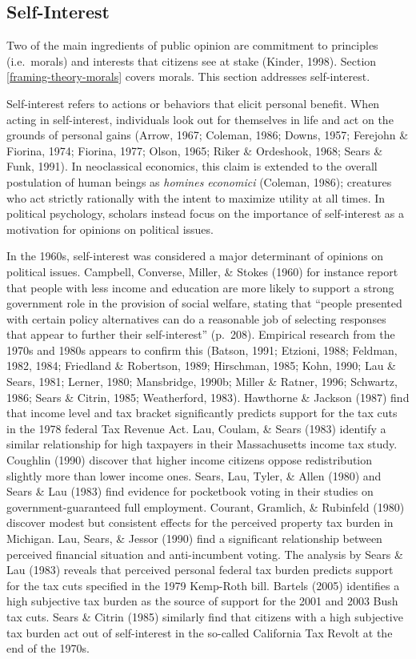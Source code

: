 \documentclass[12pt,econ]{sources/authesis}
\begin{document}
\hypertarget{framing-theory-self_interest}{%
\subsection{Self-Interest}\label{framing-theory-self_interest}}

Two of the main ingredients of public opinion are commitment to principles (i.e.~morals) and interests that citizens see at stake (Kinder, 1998). Section \ref{framing-theory-morals} covers morals. This section addresses self-interest.

Self-interest refers to actions or behaviors that elicit personal benefit. When acting in self-interest, individuals look out for themselves in life and act on the grounds of personal gains (Arrow, 1967; Coleman, 1986; Downs, 1957; Ferejohn \& Fiorina, 1974; Fiorina, 1977; Olson, 1965; Riker \& Ordeshook, 1968; Sears \& Funk, 1991). In neoclassical economics, this claim is extended to the overall postulation of human beings as \textit{homines economici} (Coleman, 1986); creatures who act strictly rationally with the intent to maximize utility at all times. In political psychology, scholars instead focus on the importance of self-interest as a motivation for opinions on political issues.

In the 1960s, self-interest was considered a major determinant of opinions on political issues. Campbell, Converse, Miller, \& Stokes (1960) for instance report that people with less income and education are more likely to support a strong government role in the provision of social welfare, stating that ``people presented with certain policy alternatives can do a reasonable job of selecting responses that appear to further their self-interest'' (p.~208). Empirical research from the 1970s and 1980s appears to confirm this (Batson, 1991; Etzioni, 1988; Feldman, 1982, 1984; Friedland \& Robertson, 1989; Hirschman, 1985; Kohn, 1990; Lau \& Sears, 1981; Lerner, 1980; Mansbridge, 1990b; Miller \& Ratner, 1996; Schwartz, 1986; Sears \& Citrin, 1985; Weatherford, 1983). Hawthorne \& Jackson (1987) find that income level and tax bracket significantly predicts support for the tax cuts in the 1978 federal Tax Revenue Act. Lau, Coulam, \& Sears (1983) identify a similar relationship for high taxpayers in their Massachusetts income tax study. Coughlin (1990) discover that higher income citizens oppose redistribution slightly more than lower income ones. Sears, Lau, Tyler, \& Allen (1980) and Sears \& Lau (1983) find evidence for pocketbook voting in their studies on government-guaranteed full employment. Courant, Gramlich, \& Rubinfeld (1980) discover modest but consistent effects for the perceived property tax burden in Michigan. Lau, Sears, \& Jessor (1990) find a significant relationship between perceived financial situation and anti-incumbent voting. The analysis by Sears \& Lau (1983) reveals that perceived personal federal tax burden predicts support for the tax cuts specified in the 1979 Kemp-Roth bill. Bartels (2005) identifies a high subjective tax burden as the source of support for the 2001 and 2003 Bush tax cuts. Sears \& Citrin (1985) similarly find that citizens with a high subjective tax burden act out of self-interest in the so-called California Tax Revolt at the end of the 1970s.
\end{document}
